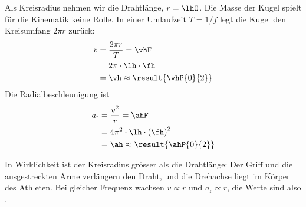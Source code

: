 Als Kreisradius nehmen wir die Drahtlänge, $r = \lhO$. Die Masse der Kugel spielt für die Kinematik keine Rolle. In einer Umlaufzeit $T = 1/f$ legt die Kugel den Kreisumfang $2\pi r$ zurück:
\begin{align}
 v &= \frac{2\pi r}{T} = \vhF \\
   &= 2\pi\cdot\lh\cdot\fh \\
   &= \vh \approx \result{\vhP{0}{2}}
\end{align}
Die Radialbeschleunigung ist
\begin{align}
 a_\text{r} &= \frac{v^2}{r} = \ahF \\
   &= 4\pi^2\cdot\lh\cdot\left(\fh\right)^2 \\
   &= \ah \approx \result{\ahP{0}{2}}
\end{align}

In Wirklichkeit ist der Kreisradius grösser als die Drahtlänge: Der Griff und die ausgestreckten Arme verlängern den Draht, und die Drehachse liegt im Körper des Athleten. Bei gleicher Frequenz wachsen $v \propto r$ und $a_\text{r} \propto r$, die Werte sind also .
